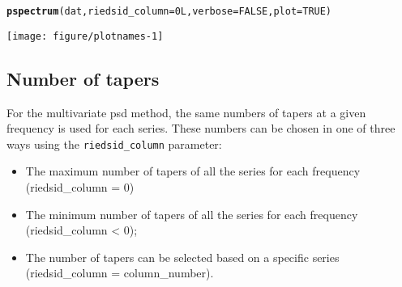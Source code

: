 \documentclass[11pt]{article}\usepackage[]{graphicx}\usepackage[]{color}
\makeatletter
\def\maxwidth{ %
  \ifdim\Gin@nat@width>\linewidth
    \linewidth
  \else
    \Gin@nat@width
  \fi
}
\newcommand{\hlnum}[1]{\textcolor[rgb]{0.686,0.059,0.569}{#1}}%
\newcommand{\hlstd}[1]{\textcolor[rgb]{0.345,0.345,0.345}{#1}}%
\newcommand{\hlkwc}[1]{\textcolor[rgb]{0.333,0.667,0.333}{#1}}%
\newcommand{\hlkwd}[1]{\textcolor[rgb]{0.737,0.353,0.396}{\textbf{#1}}}%
\newenvironment{kframe}{%
 \def\at@end@of@kframe{}%
 \ifinner\ifhmode%
  \def\at@end@of@kframe{\end{minipage}}%
  \begin{minipage}{\columnwidth}%
 \fi\fi%
 \def\FrameCommand##1{\hskip\@totalleftmargin \hskip-\fboxsep
 \colorbox{shadecolor}{##1}\hskip-\fboxsep
     \hskip-\linewidth \hskip-\@totalleftmargin \hskip\columnwidth}%
 \MakeFramed {\advance\hsize-\width
   \@totalleftmargin\z@ \linewidth\hsize
   \@setminipage}}%
 {\par\unskip\endMakeFramed%
 \at@end@of@kframe}
\newenvironment{knitrout}{}{} %
\newcommand{\Rcmd}[1]{\texttt{#1}}
\makeatother
\begin{document}
\begin{knitrout}
\color{fgcolor}\begin{kframe}
\begin{alltt}
\hlkwd{pspectrum}\hlstd{(dat,} \hlkwc{riedsid_column}\hlstd{=} \hlnum{0L}\hlstd{,} \hlkwc{verbose} \hlstd{=} \hlnum{FALSE}\hlstd{,} \hlkwc{plot} \hlstd{=} \hlnum{TRUE}\hlstd{)}
\end{alltt}
\end{kframe}
\texttt{[image: figure/plotnames-1]} 

\end{knitrout}




\newpage

\subsection{Number of tapers}

For the multivariate psd method, the same numbers of tapers at a given frequency is used for each series. These numbers can be chosen in one of three ways using the \Rcmd{riedsid\_column} parameter:

\begin{itemize}
\item The maximum number of tapers of all the series for each frequency (riedsid\_column = 0)
\item The minimum number of tapers of all the series for each frequency (riedsid\_column < 0);
\item The number of tapers can be selected based on a specific series (riedsid\_column = column\_number).
\end{itemize}
\end{document}
